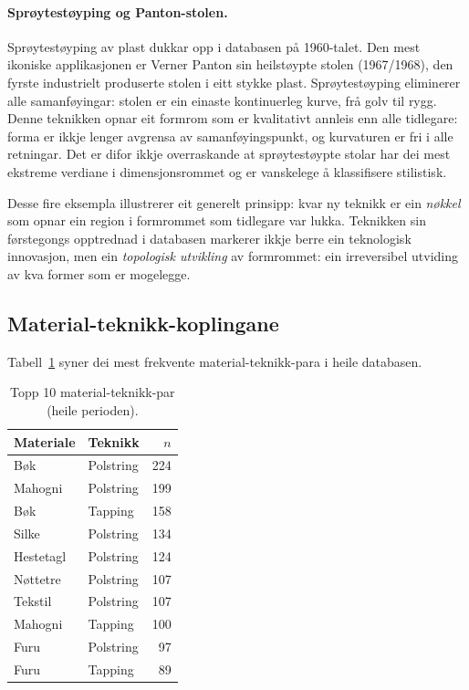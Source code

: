 \documentclass[10pt, a4paper, twocolumn]{article}
\begin{document}
\paragraph{Sprøytestøyping og Panton-stolen.} Sprøytestøyping av plast dukkar opp i databasen på 1960-talet. Den mest ikoniske applikasjonen er Verner Panton sin heilstøypte stolen (1967/1968), den fyrste industrielt produserte stolen i eitt stykke plast. Sprøytestøyping eliminerer alle samanføyingar: stolen er ein einaste kontinuerleg kurve, frå golv til rygg. Denne teknikken opnar eit formrom som er kvalitativt annleis enn alle tidlegare: forma er ikkje lenger avgrensa av samanføyingspunkt, og kurvaturen er fri i alle retningar. Det er difor ikkje overraskande at sprøytestøypte stolar har dei mest ekstreme verdiane i dimensjonsrommet og er vanskelege å klassifisere stilistisk.

Desse fire eksempla illustrerer eit generelt prinsipp: kvar ny teknikk er ein \emph{nøkkel} som opnar ein region i formrommet som tidlegare var lukka. Teknikken sin førstegongs opptrednad i databasen markerer ikkje berre ein teknologisk innovasjon, men ein \emph{topologisk utvikling} av formrommet: ein irreversibel utviding av kva former som er mogelegge.


\subsection{Material-teknikk-koplingane}

Tabell~\ref{tab:mat_tech} syner dei mest frekvente material-teknikk-para i heile databasen.

\begin{table}[H]
\centering
\caption{Topp 10 material-teknikk-par (heile perioden).}
\label{tab:mat_tech}
\begin{tabular}{@{}llr@{}}
\toprule
\textbf{Materiale} & \textbf{Teknikk} & \textbf{$n$} \\
\midrule
Bøk & Polstring & 224 \\
Mahogni & Polstring & 199 \\
Bøk & Tapping & 158 \\
Silke & Polstring & 134 \\
Hestetagl & Polstring & 124 \\
Nøttetre & Polstring & 107 \\
Tekstil & Polstring & 107 \\
Mahogni & Tapping & 100 \\
Furu & Polstring & 97 \\
Furu & Tapping & 89 \\
\bottomrule
\end{tabular}
\end{table}
\end{document}
